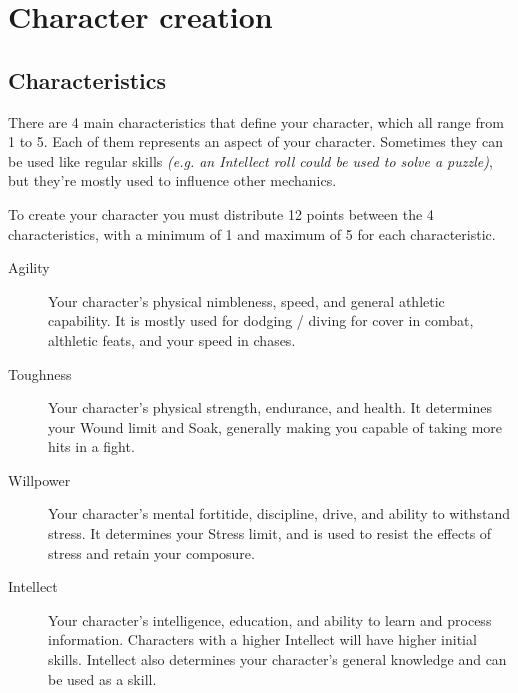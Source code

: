 \chapter{Character creation}

\section{Characteristics}


There are 4 main characteristics that define your character, which all range from 1 to 5. 
Each of them represents an aspect of your character. Sometimes they can be used like regular skills \textit{(e.g. an Intellect roll could be used to solve a puzzle)}, 
but they're mostly used to influence other mechanics. 

To create your character you must distribute 12 points between the 4 characteristics, 
with a minimum of 1 and maximum of 5 for each characteristic.

\begin{description}
    \item[Agility] 
    Your character's physical nimbleness, speed, and general athletic capability.
    It is mostly used for dodging / diving for cover in combat, althletic feats, and your speed in chases.

    \item[Toughness] 
    Your character's physical strength, endurance, and health.
    It determines your Wound limit and Soak, generally making you capable of taking more hits in a fight.

    \item[Willpower]
    Your character's mental fortitide, discipline, drive, and ability to withstand stress.
    It determines your Stress limit, and is used to resist the effects of stress and retain your composure.
    
    \item[Intellect]
    Your character's intelligence, education, and ability to learn and process information.
    Characters with a higher Intellect will have higher initial skills. 
    Intellect also determines your character's general knowledge and can be used as a skill.
\end{description}

